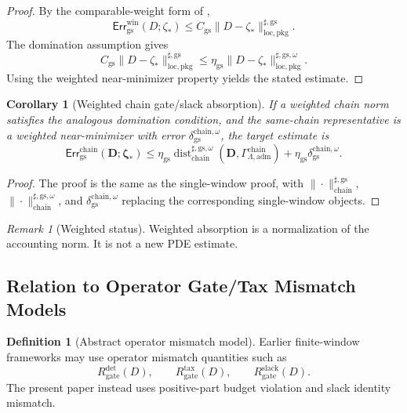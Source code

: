 \documentclass[11pt]{article}
\numberwithin{equation}{section}
\newtheorem{corollary}[corollary]{Corollary}
\theoremstyle{definition}
\newtheorem{definition}[definition]{Definition}
\theoremstyle{remark}
\newtheorem{remark}[remark]{Remark}
\newcommand{\loc}{\mathrm{loc}}
\newcommand{\pkg}{\mathrm{pkg}}
\newcommand{\adm}{\mathrm{adm}}
\newcommand{\gs}{\mathrm{gs}}
\newcommand{\chain}{\mathrm{chain}}
\newcommand{\Err}{\mathsf{Err}}
\newcommand{\Dist}{\operatorname{dist}}
\newcommand{\bD}{\mathbf D}
\newcommand{\bzeta}{\boldsymbol\zeta}
\newcommand{\Gchain}{\Gamma_{\Lambda,\adm}^{\chain}}
\begin{document}
\begin{proof}
By the comparable-weight form of ,
\[
    \Err_{\gs}^{\mathrm{win}}(D;\zeta_*)
    \le
    C_{\gs}\|D-\zeta_*\|_{\loc,\pkg}^{\sharp,\gs}.
\]
The domination assumption gives
\[
    C_{\gs}\|D-\zeta_*\|_{\loc,\pkg}^{\sharp,\gs}
    \le
    \eta_{\gs}\|D-\zeta_*\|_{\loc,\pkg}^{\sharp,\gs,\omega}.
\]
Using the weighted near-minimizer property yields the stated estimate.
\end{proof}

\begin{corollary}[Weighted chain gate/slack absorption]
\label{gs:cor:weighted-chain-gs-target}
If a weighted chain norm satisfies the analogous domination condition, and the
same-chain representative is a weighted near-minimizer with error
\(\delta_{\gs}^{\chain,\omega}\), the target estimate is
\[
    \Err_{\gs}^{\chain}(\bD;\bzeta_*)
    \le
    \eta_{\gs}
    \Dist_{\chain}^{\sharp,\gs,\omega}(\bD,\Gchain)
    +
    \eta_{\gs}\delta_{\gs}^{\chain,\omega}.
\]
\end{corollary}

\begin{proof}
The proof is the same as the single-window proof, with
\(\|\cdot\|_{\chain}^{\sharp,\gs}\),
\(\|\cdot\|_{\chain}^{\sharp,\gs,\omega}\), and
\(\delta_{\gs}^{\chain,\omega}\) replacing the corresponding single-window
objects.
\end{proof}

\begin{remark}[Weighted status]
Weighted absorption is a normalization of the accounting norm.  It is not a
new PDE estimate.
\end{remark}

\subsection{Relation to Operator Gate/Tax Mismatch Models}
\label{gs:sec:operator-model}

\begin{definition}[Abstract operator mismatch model]
\label{gs:def:operator-mismatch-model}
Earlier finite-window frameworks may use operator mismatch quantities such as
\[
    R_{\mathrm{gate}}^{\mathrm{det}}(D),
    \qquad
    R_{\mathrm{gate}}^{\mathrm{tax}}(D),
    \qquad
    R_{\mathrm{gate}}^{\mathrm{slack}}(D).
\]
The present paper instead uses positive-part budget violation and slack
identity mismatch.
\end{definition}
\end{document}
